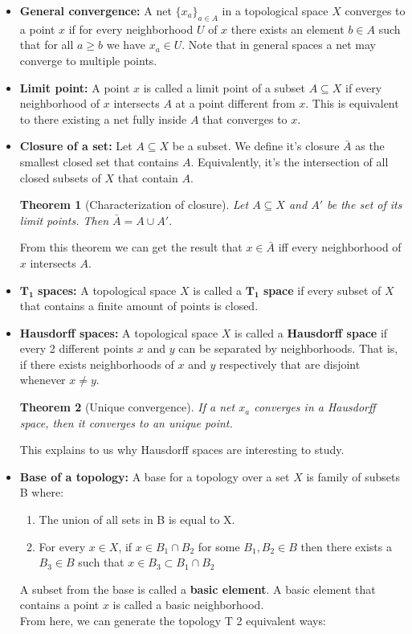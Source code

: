 \documentclass[a4paper]{article}
\newtheorem{theorem}{Theorem}[section]
\begin{document}
\begin{itemize}
\item
\textbf{General convergence: }A net $\{x_{a}\}_{a\in A}$  in a topological space $X$ converges to a point $x$ if for every neighborhood $U$ of $x$ there exists an element $b\in A$ such that for all $a\geq b$ we have $x_{a}\in U$. Note that in general spaces a net may converge to multiple points.

\item
\textbf{Limit point: }A point $x$ is called a limit point of a subset $A\subseteq X$ if every neighborhood of $x$ intersects $A$ at a point different from $x$. This is equivalent to there existing a net fully inside $A$ that converges to $x$.

\item
\textbf{Closure of a set: }Let $A\subseteq X$ be a subset. We define it's closure $\bar{A}$ as the smallest closed set that contains $A$. Equivalently, it's the intersection of all closed subsets of $X$ that contain $A$.

\begin{theorem}[Characterization of closure]
Let $A\subseteq X$ and $A'$ be the set of its limit points. Then $\bar{A}=A\cup A'$.
\end{theorem}
From this theorem we can get the result that $x\in \bar{A}$ iff every neighborhood of $x$ intersects $A$.

\item
$\boldsymbol{T_{1}}$\textbf{ spaces: }A topological space $X$ is called a $\boldsymbol{T_{1}}$\textbf{ space} if every subset of $X$ that contains a finite amount of points is closed.

\item
\textbf{Hausdorff spaces: }A topological space $X$ is called a \textbf{Hausdorff space} if every 2 different points $x$ and $y$ can be separated by neighborhoods. That is, if there exists neighborhoods of $x$ and $y$ respectively that are disjoint whenever $x\neq y$.

\begin{theorem}[Unique convergence]
If a net $x_{a}$ converges in a Hausdorff space, then it converges to an unique point.
\end{theorem}
This explains to us why Hausdorff spaces are interesting to study.

\item
\textbf{Base of a topology: }A base for a topology over a set $X$ is family of subsets B where:
\begin{enumerate}
\item
The union of all sets in B is equal to X.
\item
For every $x \in X$, if $x \in B_{1} \cap B_{2}$ for some $B_{1},B_{2} \in B$ then there exists a $B_{3} \in B$ such that $x \in B_{3} \subset B_{1} \cap B_{2}$
\end{enumerate}
A subset from the base is called a \textbf{basic element}. A basic element that contains a point $x$ is called a basic neighborhood.\\
From here, we can generate the topology T 2 equivalent ways:
\begin{enumerate}


\end{enumerate}
\end{itemize}
\end{document}
